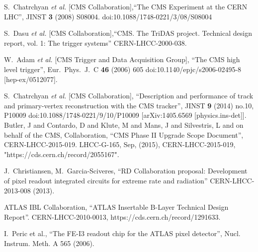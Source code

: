 \begin{thebibliography}{1}
%
 S.~Chatrchyan {\it et al.} [CMS Collaboration],``The CMS Experiment at the CERN LHC'', JINST {\bf 3} (2008) S08004. doi:10.1088/1748-0221/3/08/S08004

  S.~Dasu {\it et al.} [CMS Collaboration],``CMS. The TriDAS project. Technical design report, vol. 1: The trigger systems'' CERN-LHCC-2000-038.


  W.~Adam {\it et al.} [CMS Trigger and Data Acquisition Group], ``The CMS high level trigger'',  Eur.\ Phys.\ J.\ C {\bf 46} (2006) 605 doi:10.1140/epjc/s2006-02495-8 [hep-ex/0512077].


  S.~Chatrchyan {\it et al.} [CMS Collaboration], ``Description and performance of track and primary-vertex reconstruction with the CMS tracker'', JINST {\bf 9} (2014) no.10,  P10009 doi:10.1088/1748-0221/9/10/P10009  [arXiv:1405.6569 [physics.ins-det]].
 Butler, J and Contardo, D and Klute, M and Mans, J and
                       Silvestris, L and on behalf of the CMS, Collaboration,
      ``CMS Phase II Upgrade Scope Document'',
      CERN-LHCC-2015-019. LHCC-G-165,
      Sep, (2015),
      CERN-LHCC-2015-019, "https://cds.cern.ch/record/2055167".

 J.~Christiansen, M.~Garcia-Sciveres, ``RD Collaboration proposal: Development of pixel readout integrated circuits for extreme rate and radiation''
CERN-LHCC-2013-008 (2013).

 ATLAS IBL Collaboration, ``ATLAS Insertable B-Layer
  Technical Design Report''. CERN-LHCC-2010-0013, https://cds.cern.ch/record/1291633.

 I.~Peric et al., ``The FE-I3 readout chip for the ATLAS pixel detector'', Nucl. Instrum. Meth. A 565 (2006).


\end{thebibliography}
